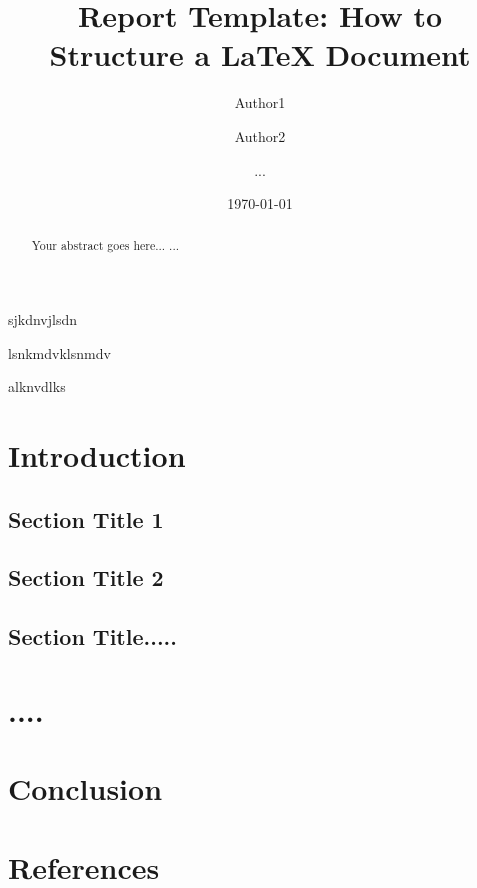 \documentclass[11pt,a4paper]{report}
\begin{document}
\title{Report Template: How to Structure a LaTeX Document}
\author{Author1 \and Author2 \and ...}
\date{\today}
\maketitle

\begin{abstract}
Your abstract goes here...
...
\end{abstract}
sjkdnvjlsdn


lsnkmdvklsnmdv

alknvdlks
\chapter{Introduction}
\section{Section Title 1}
\section{Section Title 2}
\section{Section Title.....}

\chapter{....}

\chapter{Conclusion}


\chapter*{References}
\end{document}
